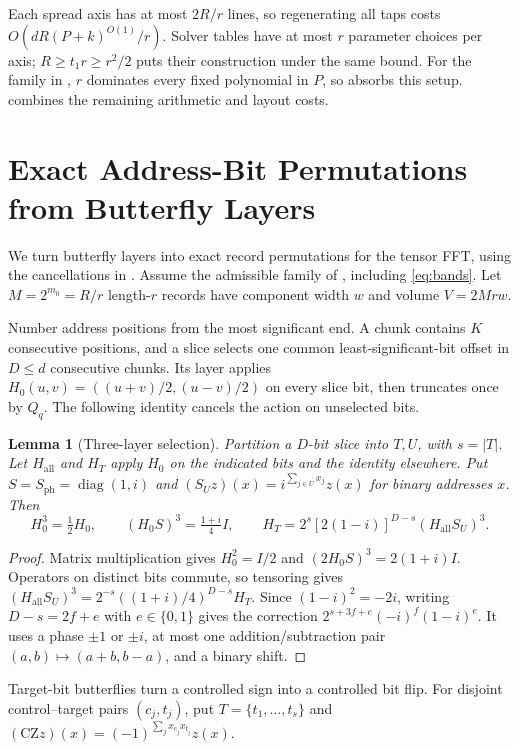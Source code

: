 \documentclass[11pt]{article}
\newtheorem{lemma}[theorem]{Lemma}
\theoremstyle{definition}
\renewcommand{\label}[1]{}%
\newcommand{\diag}{\operatorname{diag}}
\newcommand{\CZ}{\mathrm{CZ}}
\begin{document}
Each spread axis has at most $2R/r$ lines, so regenerating all taps costs
$O(dR(P+k)^{O(1)}/r)$.
Solver tables have at most $r$ parameter choices per axis;
$R\ge t_1r\ge r^2/2$ puts their construction under the same bound.
For the family in , $r$ dominates every fixed polynomial
in $P$, so  absorbs this setup.
 combines the remaining arithmetic and layout costs.


\section{Exact Address-Bit Permutations from Butterfly Layers}\label{sec:walsh}

We turn butterfly layers into exact record permutations for the tensor FFT, using the cancellations in .
Assume the admissible family of , including \eqref{eq:bands}.
Let $M=2^{m_0}=R/r$ length-$r$ records have component width $w$ and volume $V=2Mrw$.

Number address positions from the most significant end.
A chunk contains $K$ consecutive positions, and a slice selects one common least-significant-bit offset in $D\le d$ consecutive chunks.
Its layer applies $H_0(u,v)=((u+v)/2,(u-v)/2)$ on every slice bit, then truncates once by $Q_q$.
The following identity cancels the action on unselected bits.

\begin{lemma}[Three-layer selection]\label{lem:three-layer}
Partition a $D$-bit slice into $T,U$, with $s=|T|$.
Let $H_{\mathrm{all}}$ and $H_T$ apply $H_0$ on the indicated bits and the identity elsewhere.
Put $S=S_{\mathrm{ph}}=\diag(1,i)$ and
$(S_Uz)(x)=i^{\sum_{j\in U}x_j}z(x)$ for binary addresses $x$. Then
\[
 H_0^3=\tfrac12H_0,\qquad
 (H_0S)^3=\tfrac{1+i}{4}I,\qquad
 H_T=2^s[2(1-i)]^{D-s}(H_{\mathrm{all}}S_U)^3.
\]
\end{lemma}
\begin{proof}
Matrix multiplication gives $H_0^2=I/2$ and $(2H_0S)^3=2(1+i)I$.
Operators on distinct bits commute, so tensoring gives
$(H_{\mathrm{all}}S_U)^3=2^{-s}((1+i)/4)^{D-s}H_T$.
Since $(1-i)^2=-2i$, writing $D-s=2f+e$ with $e\in\{0,1\}$ gives the correction
$2^{s+3f+e}(-i)^f(1-i)^e$.
It uses a phase $\pm1$ or $\pm i$, at most one addition/subtraction pair
$(a,b)\mapsto(a+b,b-a)$, and a binary shift.
\end{proof}

Target-bit butterflies turn a controlled sign into a controlled bit flip.
For disjoint control--target pairs $(c_j,t_j)$, put $T=\{t_1,\ldots,t_s\}$
and $(\CZ z)(x)=(-1)^{\sum_jx_{c_j}x_{t_j}}z(x)$.
\end{document}
